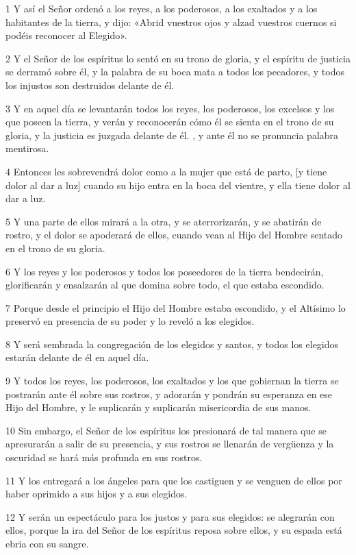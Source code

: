 \par 1 Y así el Señor ordenó a los reyes, a los poderosos, a los exaltados y a los habitantes de la tierra, y dijo: «Abrid vuestros ojos y alzad vuestros cuernos si podéis reconocer al Elegido».
\par 2 Y el Señor de los espíritus lo sentó en su trono de gloria, y el espíritu de justicia se derramó sobre él, y la palabra de su boca mata a todos los pecadores, y todos los injustos son destruidos delante de él.
\par 3 Y en aquel día se levantarán todos los reyes, los poderosos, los excelsos y los que poseen la tierra, y verán y reconocerán cómo él se sienta en el trono de su gloria, y la justicia es juzgada delante de él. , y ante él no se pronuncia palabra mentirosa.
\par 4 Entonces les sobrevendrá dolor como a la mujer que está de parto, [y tiene dolor al dar a luz] cuando su hijo entra en la boca del vientre, y ella tiene dolor al dar a luz.
\par 5 Y una parte de ellos mirará a la otra, y se aterrorizarán, y se abatirán de rostro, y el dolor se apoderará de ellos, cuando vean al Hijo del Hombre sentado en el trono de su gloria.
\par 6 Y los reyes y los poderosos y todos los poseedores de la tierra bendecirán, glorificarán y ensalzarán al que domina sobre todo, el que estaba escondido.
\par 7 Porque desde el principio el Hijo del Hombre estaba escondido, y el Altísimo lo preservó en presencia de su poder y lo reveló a los elegidos.
\par 8 Y será sembrada la congregación de los elegidos y santos, y todos los elegidos estarán delante de él en aquel día.
\par 9 Y todos los reyes, los poderosos, los exaltados y los que gobiernan la tierra se postrarán ante él sobre sus rostros, y adorarán y pondrán su esperanza en ese Hijo del Hombre, y le suplicarán y suplicarán misericordia de sus manos.
\par 10 Sin embargo, el Señor de los espíritus los presionará de tal manera que se apresurarán a salir de su presencia, y sus rostros se llenarán de vergüenza y la oscuridad se hará más profunda en sus rostros.
\par 11 Y los entregará a los ángeles para que los castiguen y se venguen de ellos por haber oprimido a sus hijos y a sus elegidos.
\par 12 Y serán un espectáculo para los justos y para sus elegidos: se alegrarán con ellos, porque la ira del Señor de los espíritus reposa sobre ellos, y su espada está ebria con su sangre.
